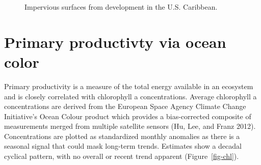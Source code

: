 \documentclass[
  letterpaper,
  oneside,
  open=any]{scrbook}
\begin{document}
\begin{figure}


\caption{\label{fig-landuse}Impervious surfaces from development in the
U.S. Caribbean.}

\end{figure}%

\section{Primary productivty via ocean
color}\label{primary-productivty-via-ocean-color}

Primary productivity is a measure of the total energy available in an
ecosystem and is closely correlated with chlorophyll a concentrations.
Average chlorophyll a concentrations are derived from the European Space
Agency Climate Change Initiative's Ocean Colour product which provides a
bias-corrected composite of measurements merged from multiple satellite
sensors (Hu, Lee, and Franz 2012). Concentrations are plotted as
standardized monthly anomalies as there is a seasonal signal that could
mask long-term trends. Estimates show a decadal cyclical pattern, with
no overall or recent trend apparent (Figure~\ref{fig-chl}).
\end{document}

